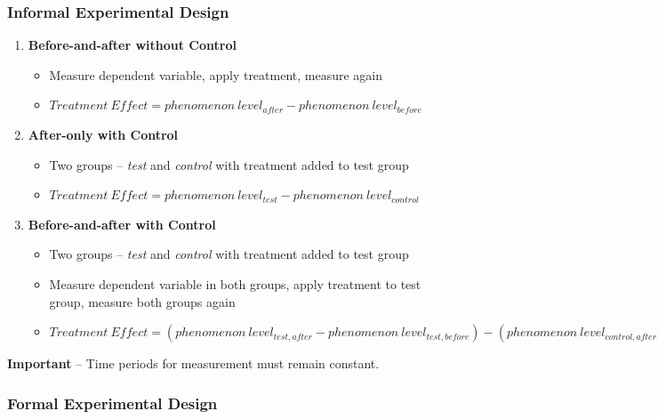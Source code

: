 \documentclass{article}
\begin{document}
\subsubsection{Informal Experimental Design}

\begin{enumerate}
    \item \textbf{Before-and-after without Control}
    \begin{itemize}
        \item Measure dependent variable, apply treatment, measure again
        \item $Treatment\ Effect = phenomenon\ level_{after} - phenomenon\ level_{before} $
    \end{itemize}
    \item \textbf{After-only with Control}
    \begin{itemize}
        \item Two groups -- \textit{test} and \textit{control} with treatment added to test group
        \item $Treatment\ Effect = phenomenon\ level_{test} - phenomenon\ level_{control} $
    \end{itemize}
    \item \textbf{Before-and-after with Control}
    \begin{itemize}
        \item Two groups -- \textit{test} and \textit{control} with treatment added to test group
        \item Measure dependent variable in both groups, apply treatment to test group, measure both groups again
        \item $Treatment\ Effect = (phenomenon\ level_{test, after} - phenomenon\ level_{test, before}) - (phenomenon\ level_{control, after} - phenomenon\ level_{control, before}) $
    \end{itemize}
\end{enumerate}

\textbf{Important} -- Time periods for measurement must remain constant.

\subsubsection{Formal Experimental Design}
\end{document}

